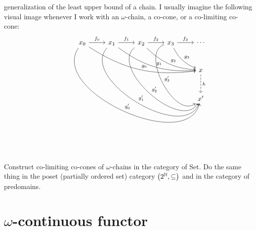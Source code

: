 \begin{enumcirc}
	generalization of the least upper bound of a chain.
	I usually imagine the following visual image whenever I work with an
	$\omega$-chain, a co-cone, or a co-limiting co-cone:
	\[
		\begin{tikzcd}[row sep=large]
			x_0 \arrow[r, "f_0"] \arrow[drrrr, "g_0", bend right = 20] \arrow[ddrrrr, "g'_0", bend right = 100] &
			x_1 \arrow[r, "f_1"] \arrow[drrr, "g_1", bend right = 20]  \arrow[ddrrr, "g'_1", bend right = 100]  &
			x_2 \arrow[r, "f_2"] \arrow[drr, "g_2", bend right = 20]   \arrow[ddrr, "g'_2", bend right = 100]   &
			x_3 \arrow[r, "f_3"] \arrow[dr, "g_3", bend right = 20]    \arrow[ddr, "g'_3", bend right = 100]    & \cdots \\
			& & & & x \arrow[d, dashed, "h"] \\
			& & & & x'
		\end{tikzcd}
	\]
	\begin{exercisetab}
		Construct co-limiting co-cones of $\omega$-chains in the category of Set.
		Do the same thing in the poset (partially ordered set) category $\left( 2^{\mathbb{N}},
				\subseteq \right)$ and in the category of predomains.
	\end{exercisetab}
\end{enumcirc}

\section{$\omega$-continuous functor}

